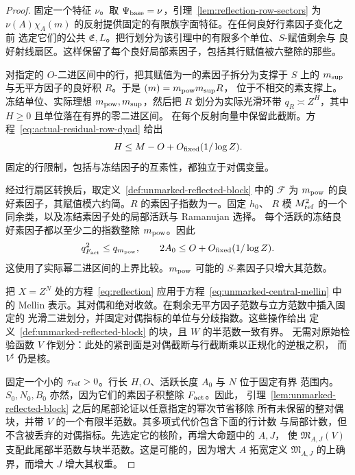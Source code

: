 \documentclass[11pt,a4paper]{article}
\numberwithin{equation}{section}
\numberwithin{figure}{section}
\theoremstyle{definition}
\theoremstyle{remark}
\begin{document}
\begin{proof}
固定一个特征 $\nu$。取 $\Psi_{\rm base}=\nu$，引理~\ref{lem:reflection-row-sectors}
为 $\nu(A)\chi_A(m)$ 的反射提供固定的有限族字面特征。在任何良好行素因子变化之前
选定它们的公共 $\mathfrak E,L$。把行划分为该引理中的有限多个单位、$S$-赋值剩余与
良好射线扇区。这样保留了每个良好局部素因子，包括其行赋值被六整除的那些。

对指定的 $O$-二进区间中的行，把其赋值为一的素因子拆分为支撑于 $S$ 上的
$m_{\rm sup}$ 与无平方因子的良好积 $R$。于是 $(m)=m_{\rm pow}m_{\rm sup}R$，
位于不相交的素支撑上。冻结单位、实际理想 $m_{\rm pow},m_{\rm sup}$，然后把 $R$
划分为实际光滑环带 $q_R\asymp Z^H$，其中 $H\ge0$ 且单位落在有界的零二进区间。
在每个反射向量中保留此截断。方程~\eqref{eq:actual-residual-row-dyad} 给出
\begin{equation}\label{eq:unmarked-row-width}
 H\le M-O+O_{\rm fixed}(1/\log Z).
\end{equation}
固定的行限制，包括与冻结因子的互素性，都独立于对偶变量。

经过行扇区转换后，取定义~\ref{def:unmarked-reflected-block} 中的 $\mathcal F$
为 $m_{\rm pow}$ 的良好素因子，其赋值模六约简。$R$ 的素因子指数为一。固定 $h_0$、
$R$ 模 $M_{\rm ref}^2$ 的一个同余类，以及冻结素因子处的局部活跃与 Ramanujan 选择。
每个活跃的冻结良好素因子都以至少二的指数整除 $m_{\rm pow}$。因此
\begin{equation}\label{eq:unmarked-powerful-radical}
 q_{F_{\rm act}}^2\le q_{m_{\rm pow}},\qquad
 2A_0\le O+O_{\rm fixed}(1/\log Z).
\end{equation}
这使用了实际幂二进区间的上界比较。$m_{\rm pow}$ 可能的 $S$-素因子只增大其范数。

把 $X=Z^N$ 处的方程~\eqref{eq:reflection} 应用于方程~\eqref{eq:unmarked-central-mellin}
中的 Mellin 表示。其对偶和绝对收敛。在剩余无平方因子范数与立方范数中插入固定的
光滑二进划分，并固定对偶指标的单位与分歧指数。这些操作给出
定义~\ref{def:unmarked-reflected-block} 的块，且 $W$ 的半范数一致有界。
无需对原始检验函数 $V$ 作划分：此处的紧剖面是对偶截断与行截断乘以正规化的逆根之积，
而 $V^\sharp$ 仍是核。

固定一个小的 $\tau_{\rm ref}>0$。行长 $H,O$、活跃长度 $A_0$ 与 $N$ 位于固定有界
范围内。$S_0,N_0,B_0$ 亦然，因为它们的素因子积整除 $F_{\rm act}$。因此，
引理~\ref{lem:unmarked-reflected-block} 之后的尾部论证以任意指定的幂次节省移除
所有未保留的整对偶块，并带 $V$ 的一个有限半范数。其多项式代价包含下面的行计数
与局部计数，但不含被丢弃的对偶指标。先选定它的核阶，再增大命题中的 $A,J$，
使 $\mathfrak M_{A,J}(V)$ 支配此尾部半范数与块半范数。这是可能的，因为增大 $A$
拓宽定义 $\mathfrak M_{A,J}$ 的上确界，而增大 $J$ 增大其权重。


\end{proof}
\end{document}

